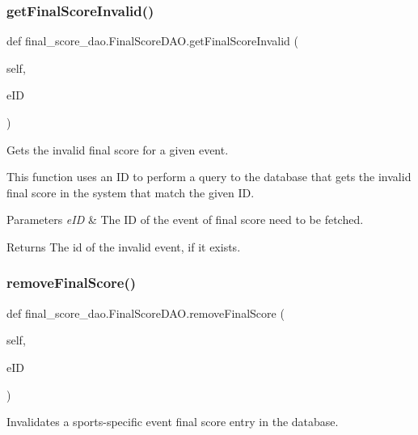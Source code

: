 \subsubsection{\texorpdfstring{get\+Final\+Score\+Invalid()}{getFinalScoreInvalid()}}
{\footnotesize\ttfamily def final\+\_\+score\+\_\+dao.\+Final\+Score\+D\+A\+O.\+get\+Final\+Score\+Invalid (\begin{DoxyParamCaption}\item[{}]{self,  }\item[{}]{e\+ID }\end{DoxyParamCaption})}



Gets the invalid final score for a given event. 

This function uses an ID to perform a query to the database that gets the invalid final score in the system that match the given ID.


\begin{DoxyParams}{Parameters}
{\em e\+ID} & The ID of the event of final score need to be fetched.\\
\hline
\end{DoxyParams}
\begin{DoxyReturn}{Returns}
The id of the invalid event, if it exists. 
\end{DoxyReturn}
\mbox{\label{classfinal__score__dao_1_1_final_score_d_a_o_ac615b6b55d71e6144b2527f1de67c36a}} 
\subsubsection{\texorpdfstring{remove\+Final\+Score()}{removeFinalScore()}}
{\footnotesize\ttfamily def final\+\_\+score\+\_\+dao.\+Final\+Score\+D\+A\+O.\+remove\+Final\+Score (\begin{DoxyParamCaption}\item[{}]{self,  }\item[{}]{e\+ID }\end{DoxyParamCaption})}



Invalidates a sports-\/specific event final score entry in the database. 

